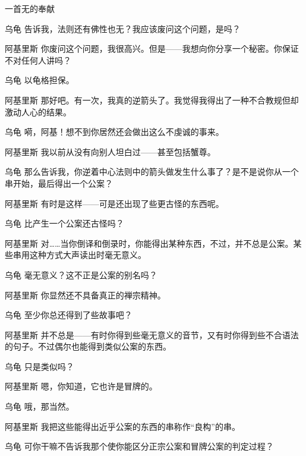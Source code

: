 \begin{dialog}{一首无的奉献\label{abcd}}
\begin{dialogue}
\item[乌龟]告诉我，法则还有佛性也无？我应该废问这个问题，是吗？

\item[阿基里斯]你废问这个问题，我很高兴。但是——我想向你分享一个秘密。你保证不对任何人讲吗？

\item[乌龟]以龟格担保。

\item[阿基里斯]那好吧。有一次，我真的逆箭头了。我觉得我得出了一种不合教规但却激动人心的结果。

\item[乌龟]嗬，阿基！想不到你居然还会做出这么不虔诚的事来。

\item[阿基里斯]我以前从没有向别人坦白过——甚至包括蟹尊。

\item[乌龟]那么告诉我，你逆着中心法则中的箭头做发生什么事了？是不是说你从一个串开始，最后得出一个公案？

\item[阿基里斯]有时是这样——可是还出现了些更古怪的东西呢。

\item[乌龟]比产生一个公案还古怪吗？

\item[阿基里斯]对……当你倒译和倒录时，你能得出某种东西，不过，并不总是公案。某些串用这种方式大声读出时毫无意义。

\item[乌龟]毫无意义？这不正是公案的别名吗？

\item[阿基里斯]你显然还不具备真正的禅宗精神。

\item[乌龟]至少你总还得到了些故事吧？

\item[阿基里斯]并不总是——有时你得到些毫无意义的音节，又有时你得到些不合语法的句子。不过偶尔也能得到类似公案的东西。

\item[乌龟]只是类似吗？

\item[阿基里斯]嗯，你知道，它也许是冒牌的。

\item[乌龟]哦，那当然。

\item[阿基里斯]我把这些能得出近乎公案的东西的串称作“良构”的串。

\item[乌龟]可你干嘛不告诉我那个使你能区分正宗公案和冒牌公案的判定过程？


\end{dialogue}
\end{dialog}
